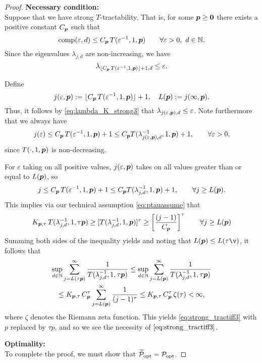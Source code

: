 \documentclass[11pt,a4paper]{article}
\begin{document}
\begin{proof}
\bigskip
\noindent \textbf{Necessary condition:} \\
Suppose that we have strong
$T$-tractability. That is, for some $\boldsymbol{p} \ge \boldsymbol{0}$ there exists a positive constant $C_{\boldsymbol{p}}$ such that
\[
\operatorname{comp}(\varepsilon,d)\le C_{\boldsymbol{p}}\, T(\varepsilon^{-1},1,\boldsymbol{p})
\qquad \forall \varepsilon > 0, \ d \in \mathbb{N}.
\]
Since the eigenvalues $\lambda_{j,d}$ are non-increasing, we have
\begin{equation}\label{eq:lambda_K_strong3}
\lambda_{\lfloor C_{\boldsymbol{p}}\, T(\varepsilon^{-1},1,\boldsymbol{p})\rfloor +1,d}\le \varepsilon.
\end{equation}

Define
\[
j (\varepsilon,\boldsymbol{p}):= \lfloor C_{\boldsymbol{p}}\, T(\varepsilon^{-1},1,\boldsymbol{p})\rfloor +1, \quad
 L(\boldsymbol{p}):= j (\infty,\boldsymbol{p}).
\]
Thus, it follows by \eqref{eq:lambda_K_strong3} that $\lambda_{j(\varepsilon,\boldsymbol{p}),d} \le \varepsilon$.
Note furthermore that we always have
\[
j(\varepsilon)\le C_{\boldsymbol{p}}\, T(\varepsilon^{-1},1,\boldsymbol{p})+1 \le C_{\boldsymbol{p}} T(\lambda_{j(\varepsilon,\boldsymbol{p}),d}^{-1},1,\boldsymbol{p})+1, \qquad \forall \varepsilon > 0,
\]
since
$T(\cdot,1, \boldsymbol{p})$ is non-decreasing.

For $\varepsilon$ taking on all positive values, $j(\varepsilon,\boldsymbol{p})$ takes on all values greater than or equal to $L(\boldsymbol{p})$, so
\[
j\le C_{\boldsymbol{p}}\, T(\varepsilon^{-1},1,\boldsymbol{p})+1 \le C_{\boldsymbol{p}} T(\lambda_{j,d}^{-1},1,\boldsymbol{p})+1, \qquad \forall j \ge L(\boldsymbol{p}).
\]
This implies via our technical assumption \eqref{eq:ptauassume} that
\begin{equation*}
 K_{\boldsymbol{p},\tau}\,T (\lambda_{j,d}^{-1},1,\tau \boldsymbol{p}) \ge
 [T(\lambda_{j,d}^{-1},1, \boldsymbol{p})]^\tau
 \ge
  \left[\frac{(j-1)}{C_{\boldsymbol{p}}}\right]^\tau \qquad \forall j \ge L(\boldsymbol{p})
\end{equation*}
Summing both sides of the inequality yields and noting that $L(\vp) \le L(\tau\v)$, it follows that
\begin{multline*}
\sup_{d\in\mathbb{N}} \sum_{j=L(\tau\boldsymbol{p})}^\infty \frac{1}{T (\lambda_{j,d}^{-1},1, \tau \boldsymbol{p})} \le
\sup_{d\in\mathbb{N}} \sum_{j=L(\boldsymbol{p})}^\infty \frac{1}{T (\lambda_{j,d}^{-1},1, \tau \boldsymbol{p})} \\
\le K_{\boldsymbol{p},\tau}\, C_{\boldsymbol{p}}^\tau
\sum_{j=L(\boldsymbol{p})}^\infty \frac{1}{(j-1)^\tau} \le
K_{\boldsymbol{p},\tau}\, C_{\boldsymbol{p}}^\tau\, \zeta (\tau) < \infty,
\end{multline*}
where $\zeta$ denotes the Riemann zeta function.
This yields \eqref{eq:strong_tractiff3} with $p$ replaced by $\tau p$, and so we see the necessity of $\eqref{eq:strong_tractiff3}$.

\bigskip
\noindent \textbf{Optimality:} \\
To complete the proof, we must show that $\widetilde{\mathcal{P}}_{\textup{opt}} = \mathcal{P}_{\textup{opt}}$.




\end{proof}
\end{document}
